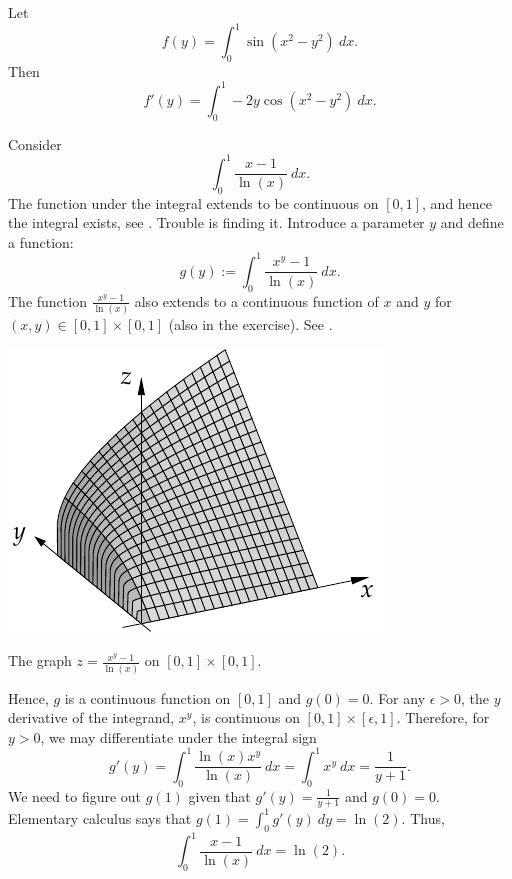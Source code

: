 \begin{example}
Let
\begin{equation*}
f(y) = \int_0^1 \sin(x^2-y^2) ~dx .
\end{equation*}
Then
\begin{equation*}
f'(y) = \int_0^1 -2y\cos(x^2-y^2) ~dx .
\end{equation*}
\end{example}

\begin{example} \label{example:counterexamplediffunder}
Consider
\begin{equation*}
\int_0^{1} \frac{x-1}{\ln(x)} ~dx .
\end{equation*}
The function under the integral 
extends to be continuous on $[0,1]$, and hence
the integral exists, see .  Trouble is finding it.  Introduce a parameter $y$
and define a function:
\begin{equation*}
g(y) := \int_0^{1} \frac{x^y-1}{\ln(x)} ~dx .
\end{equation*}
The function
$\frac{x^y-1}{\ln(x)}$
also extends to a continuous function of $x$ and $y$
for $(x,y) \in [0,1] \times [0,1]$ (also in the exercise).
See .
\begin{myfigureht}
\includegraphics{figures/diffunderexample}
\caption{The graph $z= \frac{x^y-1}{\ln(x)}$ on $[0,1] \times [0,1]$.\label{fig:diffunderexample}}
\end{myfigureht}


Hence,
$g$ is a continuous function on $[0,1]$ and $g(0) = 0$.
For any $\epsilon > 0$, the $y$ derivative of the integrand, $x^y$,
is continuous on $[0,1] \times [\epsilon,1]$.  Therefore,
for $y >0$, we may differentiate under the integral sign
\begin{equation*}
g'(y) =
\int_0^{1} \frac{\ln(x) x^y}{\ln(x)} ~dx 
=
\int_0^{1} x^y ~dx =
\frac{1}{y+1} .
\end{equation*}
We need to figure out $g(1)$ given that $g'(y) = \frac{1}{y+1}$ and $g(0) =
0$.  Elementary calculus says that $g(1) = \int_0^1 g'(y)~dy = \ln(2)$.
Thus,
\begin{equation*}
\int_0^{1} \frac{x-1}{\ln(x)} ~dx  = \ln(2).
\end{equation*}
\end{example}

